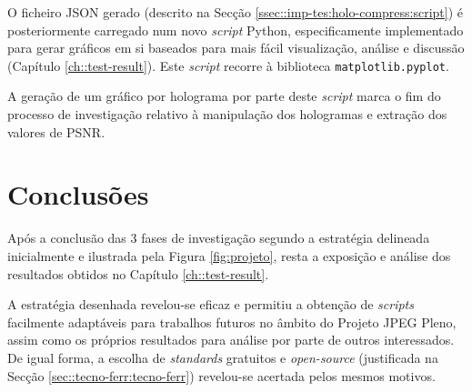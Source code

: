 O ficheiro \ac{JSON} gerado (descrito na Secção \ref{ssec::imp-tes:holo-compress:script}) é posteriormente carregado num novo \textit{script} Python, especificamente implementado para gerar gráficos em si baseados para mais fácil visualização, análise e discussão (Capítulo \ref{ch::test-result}). Este \textit{script} recorre à biblioteca \verb|matplotlib.pyplot|.

A geração de um gráfico por holograma por parte deste \textit{script} marca o fim do processo de investigação relativo à manipulação dos hologramas e extração dos valores de \ac{PSNR}.


\section{Conclusões}
\label{sec::imp-test:conclusao}

Após a conclusão das 3 fases de investigação segundo a estratégia delineada inicialmente e ilustrada pela Figura \ref{fig:projeto}, resta a exposição e análise dos resultados obtidos no Capítulo \ref{ch::test-result}.

A estratégia desenhada revelou-se eficaz e permitiu a obtenção de \textit{scripts} facilmente adaptáveis para trabalhos futuros no âmbito do Projeto JPEG Pleno, assim como os próprios resultados para análise por parte de outros interessados. De igual forma, a escolha de \textit{standards} gratuitos e \textit{open-source} (justificada na Secção \ref{sec::tecno-ferr:tecno-ferr}) revelou-se acertada pelos mesmos motivos.

